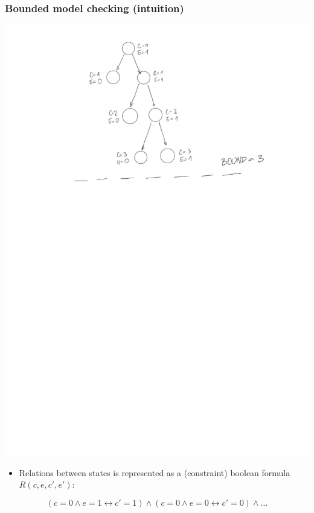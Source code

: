 \documentclass[usenames,dvipsnames]{beamer}
\begin{document}
\begin{frame}
  \frametitle{Bounded model checking (intuition)}
  
\begin{minipage}[c]{0.5\textwidth}
  \includegraphics[scale=.3]{boundedmc}
  \end{minipage}\begin{minipage}[c]{0.5\textwidth} \begin{itemize}
  \item Relations between states is represented as a (constraint) boolean formula $R(c, e, c', e')$: 
\end{itemize}
\end{minipage}
\begin{scriptsize}
\[(c=0 \land e=1 \leftrightarrow c'=1) \land (c=0 \land e=0 \leftrightarrow c'=0) \land \ldots\]
\end{scriptsize}

\end{frame}
\end{document}

